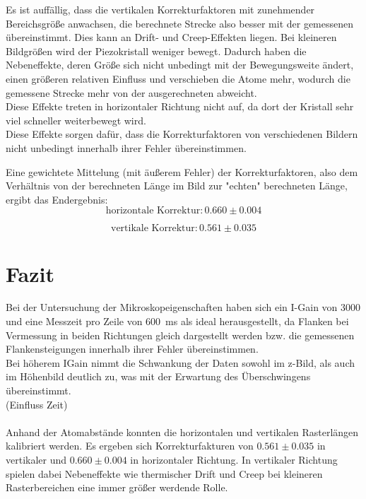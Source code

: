 \documentclass[12pt,a4paper]{article}
\begin{document}
Es ist auffällig, dass die vertikalen Korrekturfaktoren mit zunehmender Bereichsgröße anwachsen, die berechnete Strecke also besser mit der gemessenen übereinstimmt. Dies kann an Drift- und Creep-Effekten liegen. Bei kleineren Bildgrößen wird der Piezokristall weniger bewegt. Dadurch haben die Nebeneffekte, deren Größe sich nicht unbedingt mit der Bewegungsweite ändert, einen größeren relativen Einfluss und verschieben die Atome mehr, wodurch die gemessene Strecke mehr von der ausgerechneten abweicht.\\
Diese Effekte treten in horizontaler Richtung nicht auf, da dort der Kristall sehr viel schneller weiterbewegt wird.\\
Diese Effekte sorgen dafür, dass die Korrekturfaktoren von verschiedenen Bildern nicht unbedingt innerhalb ihrer Fehler übereinstimmen.

Eine gewichtete Mittelung (mit äußerem Fehler) der Korrekturfaktoren, also dem Verhältnis von der berechneten Länge im Bild zur "echten" berechneten Länge, ergibt das Endergebnis:
\begin{equation*}
\boxed{\textrm{horizontale Korrektur}: 0.660\pm 0.004}
\end{equation*}

\begin{equation*}
\boxed{\textrm{vertikale Korrektur}: 0.561\pm 0.035}
\end{equation*}


\section{Fazit}
Bei der Untersuchung der Mikroskopeigenschaften haben sich ein I-Gain von 3000 und eine Messzeit pro Zeile von \SI{600}{ms} als ideal herausgestellt, da Flanken bei Vermessung in beiden Richtungen gleich dargestellt werden bzw. die gemessenen Flankensteigungen innerhalb ihrer Fehler übereinstimmen.\\
Bei höherem IGain nimmt die Schwankung der Daten sowohl im z-Bild, als auch im Höhenbild deutlich zu, was mit der Erwartung des Überschwingens übereinstimmt.\\
(Einfluss Zeit)\\
\\
Anhand der Atomabstände konnten die horizontalen und vertikalen Rasterlängen kalibriert werden. Es ergeben sich Korrekturfakturen von $0.561\pm 0.035$ in vertikaler und $0.660\pm 0.004$ in horizontaler Richtung. In vertikaler Richtung spielen dabei Nebeneffekte wie thermischer Drift und Creep bei kleineren Rasterbereichen eine immer größer werdende Rolle.
\end{document}
